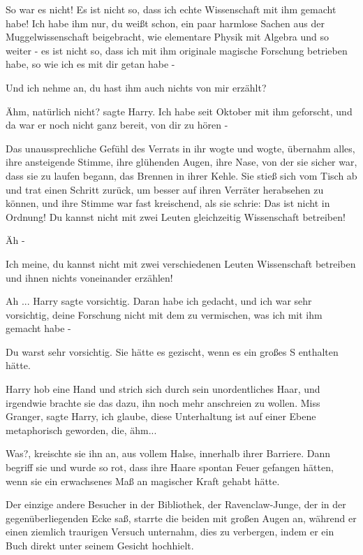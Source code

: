 \glqq{}So war es nicht! Es ist nicht so, dass ich echte Wissenschaft mit ihm
gemacht habe! Ich habe ihm nur, du weißt schon, ein paar harmlose Sachen aus der
Muggelwissenschaft beigebracht, wie elementare Physik mit Algebra und so weiter
- es ist nicht so, dass ich mit ihm originale magische Forschung betrieben habe,
so wie ich es mit dir getan habe -\grqq{}

\glqq{}Und ich nehme an, du hast ihm auch nichts von mir erzählt?\grqq{}

\glqq{}Ähm, natürlich nicht?\grqq{} sagte Harry. \glqq{}Ich habe seit Oktober mit
ihm geforscht, und da war er noch nicht ganz bereit, von dir zu hören -\grqq{}

Das unaussprechliche Gefühl des Verrats in ihr wogte und wogte, übernahm alles,
ihre ansteigende Stimme, ihre glühenden Augen, ihre Nase, von der sie sicher
war, dass sie zu laufen begann, das Brennen in ihrer Kehle. Sie stieß sich vom
Tisch ab und trat einen Schritt zurück, um besser auf ihren Verräter herabsehen
zu können, und ihre Stimme war fast kreischend, als sie schrie: \glqq{}Das ist
nicht in Ordnung! Du kannst nicht mit zwei Leuten gleichzeitig Wissenschaft
betreiben!\grqq{}

\glqq{}Äh -\grqq{}

\glqq{}Ich meine, du kannst nicht mit zwei verschiedenen Leuten Wissenschaft
betreiben und ihnen nichts voneinander erzählen!\grqq{}

\glqq{}Ah ...\grqq{} Harry sagte vorsichtig. \glqq{}Daran habe ich gedacht, und
ich war sehr vorsichtig, deine Forschung nicht mit dem zu vermischen, was ich
mit ihm gemacht habe -\grqq{}

\glqq{}Du warst sehr vorsichtig.\grqq{} Sie hätte es gezischt, wenn es ein großes
\glqq{}S\grqq{} enthalten hätte.

Harry hob eine Hand und strich sich durch sein unordentliches Haar, und
irgendwie brachte sie das dazu, ihn noch mehr anschreien zu wollen. \glqq{}Miss
Granger\grqq{}, sagte Harry, \glqq{}ich glaube, diese Unterhaltung ist auf einer
Ebene metaphorisch geworden, die, ähm...\grqq{}

\glqq{}Was?\grqq{}, kreischte sie ihn an, aus vollem Halse, innerhalb ihrer
Barriere. Dann begriff sie und wurde so rot, dass ihre Haare spontan Feuer
gefangen hätten, wenn sie ein erwachsenes Maß an magischer Kraft gehabt hätte.

Der einzige andere Besucher in der Bibliothek, der Ravenclaw-Junge, der in der
gegenüberliegenden Ecke saß, starrte die beiden mit großen Augen an, während er
einen ziemlich traurigen Versuch unternahm, dies zu verbergen, indem er ein Buch
direkt unter seinem Gesicht hochhielt.

